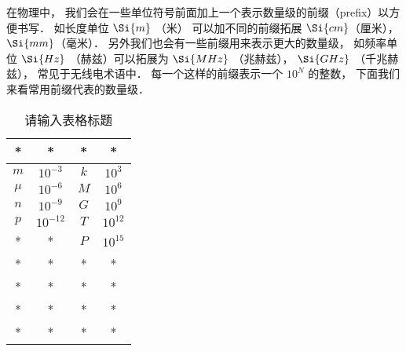 
在物理中， 我们会在一些单位符号前面加上一个表示数量级的前缀（prefix）以方便书写． 如长度单位 $\Si{m}$ （米） 可以加不同的前缀拓展 $\Si{cm}$（厘米）， $\Si{mm}$（毫米）． 另外我们也会有一些前缀用来表示更大的数量级， 如频率单位 $\Si{Hz}$ （赫兹）可以拓展为 $\Si{MHz}$ （兆赫兹）， $\Si{GHz}$ （千兆赫兹）， 常见于无线电术语中． 每一个这样的前缀表示一个 $10^N$ 的整数， 下面我们来看常用前缀代表的数量级．

\begin{table}[ht]
\centering
\caption{请输入表格标题}\label{UniPre_tab1}
\begin{tabular}{|c|c|c|c|}
\hline
* & * & * & * \\
\hline
$m$ & $10^{-3}$ & $k$ & $10^3$ \\
\hline
$\mu$ & $10^{-6}$ & $M$ & $10^6$ \\
\hline
$n$ & $10^{-9}$ & $G$ & $10^9$ \\
\hline
$p$ & $10^{-12}$ & $T$ & $10^{12}$ \\
\hline
* & * & $P$ & $10^{15}$ \\
\hline
* & * & * & * \\
\hline
* & * & * & * \\
\hline
* & * & * & * \\
\hline
* & * & * & * \\
\hline
\end{tabular}
\end{table}
